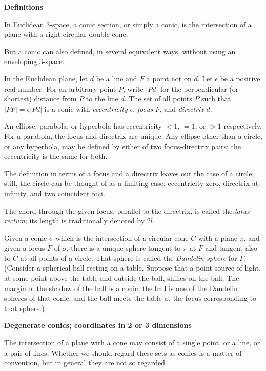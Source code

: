 \documentclass[12pt]{article}
\begin{document}
\textbf{Definitions}

In Euclidean 3-space, a conic section, or simply a conic, is the
intersection of a plane with a right circular double cone. 

But a conic can also defined, in several equivalent ways,
without using an enveloping 3-space.

In the Euclidean plane, let $d$ be a line and $F$ a point not on
$d$. Let $\epsilon$ be a positive real number.
For an arbitrary point $P$, write $|Pd|$ for the perpendicular
(or shortest) distance from $P$ to the line $d$.
The set of all points $P$ such that $|PF|=\epsilon|Pd|$ is a conic
with \emph{eccentricity} $\epsilon$, \emph{focus} $F$, and
\emph{directrix} $d$.

An ellipse, parabola, or hyperbola has eccentricity $<1$, $=1$, or
$>1$ respectively.
For a parabola, the focus and directrix are unique.
Any ellipse other than a circle, or any hyperbola, may be defined by
either of two focus-directrix pairs; the eccentricity is the same for both.

The definition in terms of a focus and a directrix leaves out the case
of a circle; still, the circle can be thought of as a limiting case:
eccentricity zero, directrix at infinity, and two coincident foci.

The chord through the given focus, parallel to the directrix,
is called the \emph{latus rectum}; its length is traditionally
denoted by $2l$.

Given a conic $\sigma$ which is the intersection of
a circular cone $C$ with a plane $\pi$, and given a focus $F$ of $\sigma$,
there is a unique sphere tangent to $\pi$ at $F$ and tangent also to $C$
at all points of a circle.
That sphere is called the \emph{Dandelin sphere} for $F$.
(Consider a spherical ball resting on a table.
Suppose that a point source of light, at some point above the table
and outside the ball, shines on the ball.
The margin of the shadow of the ball is a conic,
the ball is one of the Dandelin spheres of that conic,
and the ball meets the table at the focus corresponding to that sphere.)

\textbf{Degenerate conics; coordinates in 2 or 3 dimensions}

The intersection of a plane with a cone may consist of a
single point, or a line, or a pair of lines.
Whether we should regard these sets as conics is a matter
of convention, but in general they are not so regarded.
\end{document}
